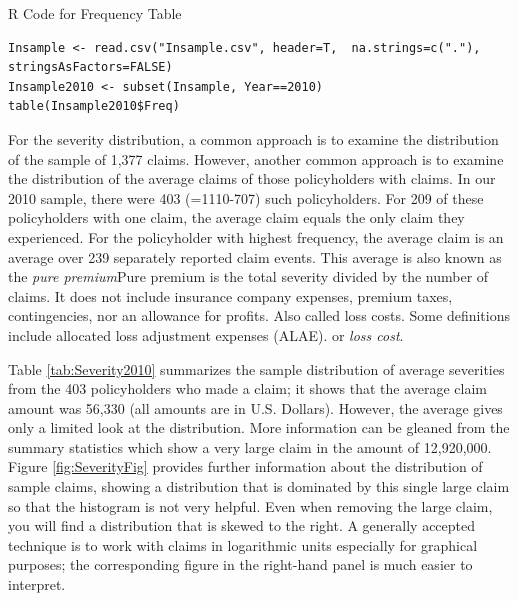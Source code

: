 \documentclass[]{book}
\theoremstyle{definition}
\theoremstyle{definition}
\theoremstyle{definition}
\theoremstyle{remark}
\begin{document}
R Code for Frequency Table

\hypertarget{display.T:Frequency.2}{}
\begin{verbatim}
Insample <- read.csv("Insample.csv", header=T,  na.strings=c("."), stringsAsFactors=FALSE)
Insample2010 <- subset(Insample, Year==2010)
table(Insample2010$Freq)
\end{verbatim}

For the severity distribution, a common approach is to examine the
distribution of the sample of 1,377 claims. However, another common
approach is to examine the distribution of the average claims of those
policyholders with claims. In our 2010 sample, there were 403
(=1110-707) such policyholders. For 209 of these policyholders with one
claim, the average claim equals the only claim they experienced. For the
policyholder with highest frequency, the average claim is an average
over 239 separately reported claim events. This average is also known as
the \emph{pure premium}{Pure premium is the total severity divided by
the number of claims. It does not include insurance company expenses,
premium taxes, contingencies, nor an allowance for profits. Also called
loss costs. Some definitions include allocated loss adjustment expenses
(ALAE).} or \emph{loss cost}.

Table \ref{tab:Severity2010} summarizes the sample distribution of
average severities from the 403 policyholders who made a claim; it shows
that the average claim amount was 56,330 (all amounts are in U.S.
Dollars). However, the average gives only a limited look at the
distribution. More information can be gleaned from the summary
statistics which show a very large claim in the amount of 12,920,000.
Figure \ref{fig:SeverityFig} provides further information about the
distribution of sample claims, showing a distribution that is dominated
by this single large claim so that the histogram is not very helpful.
Even when removing the large claim, you will find a distribution that is
skewed to the right. A generally accepted technique is to work with
claims in logarithmic units especially for graphical purposes; the
corresponding figure in the right-hand panel is much easier to
interpret.
\end{document}
